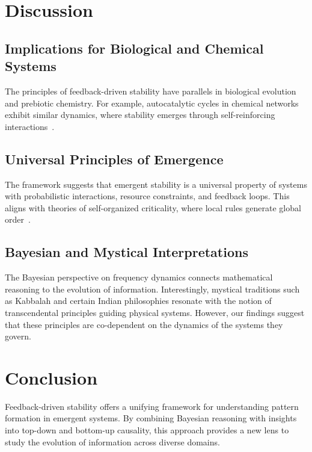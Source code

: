 \documentclass[entropy,article,submit,pdftex,moreauthors]{Definitions/mdpi}
\begin{document}
\section{Discussion}

\subsection{Implications for Biological and Chemical Systems}

The principles of feedback-driven stability have parallels in biological evolution and prebiotic chemistry. For example, autocatalytic cycles in chemical networks exhibit similar dynamics, where stability emerges through self-reinforcing interactions~\cite{kauffman1993origins}.

\subsection{Universal Principles of Emergence}

The framework suggests that emergent stability is a universal property of systems with probabilistic interactions, resource constraints, and feedback loops. This aligns with theories of self-organized criticality, where local rules generate global order~\cite{bak1996how}.

\subsection{Bayesian and Mystical Interpretations}

The Bayesian perspective on frequency dynamics connects mathematical reasoning to the evolution of information. Interestingly, mystical traditions such as Kabbalah and certain Indian philosophies resonate with the notion of transcendental principles guiding physical systems. However, our findings suggest that these principles are co-dependent on the dynamics of the systems they govern.

\section{Conclusion}

Feedback-driven stability offers a unifying framework for understanding pattern formation in emergent systems. By combining Bayesian reasoning with insights into top-down and bottom-up causality, this approach provides a new lens to study the evolution of information across diverse domains.
\end{document}
